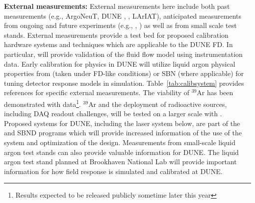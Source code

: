 \textbf{External measurements:} External measurements here include both past measurements (e.g., ArgoNeuT, DUNE , , LArIAT), anticipated measurements from ongoing and future experiments (e.g., , ) as well as from small scale  test stands. External measurements provide a test bed for proposed calibration hardware systems and techniques which are applicable to the DUNE FD. In particular,  will provide validation of the fluid flow model using instrumentation data. Early calibration for physics in DUNE will utilize liquid argon physical properties from  (taken under FD-like conditions) or SBN (where applicable) for tuning detector response models in simulation. Table~\ref{tab:calibsystem} provides  references for specific external measurements. The viability of ${}^{39}$Ar has been demonstrated with \microboone data\footnote{Results expected to be released publicly sometime later this year}. ${}^{39}$Ar and the deployment of radioactive sources, including DAQ readout challenges, will be tested on a larger scale with . Proposed systems for DUNE, including the laser system below, are part of the \microboone and SBND programs which will provide increased information of the use of the system and optimization of the design. Measurements from small-scale liquid argon test stands can also provide valuable information for DUNE. The liquid argon test stand planned at Brookhaven National Lab will provide important information for how field response is simulated and calibrated at DUNE.





